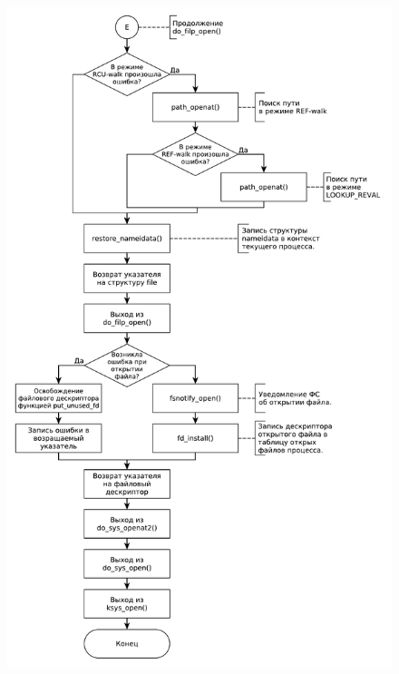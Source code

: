 \documentclass[a4paper,oneside,12pt]{extreport}
\begin{document}
\begin{figure}[H]
	\centering
	\includegraphics[scale=0.67]{inc/img/open6}
\end{figure}
\end{document}
